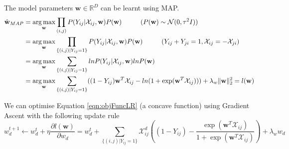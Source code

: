 	The model parameters $\textbf{w} \in \mathbb{R}^D$ can be learnt using MAP.
	\begin{align}
		\label{eqn:objFuncLR}
		\hat{\textbf{w}}_{MAP} &= \operatorname*{arg\,max}_{\textbf{w}} \prod_{(i,j)} P(Y_{ij}| \mathcal{X}_{ij}, \textbf{w}) P(\textbf{w}) \hspace{1 cm} \text{($P(\textbf{w}) \sim \mathcal{N} (0, \tau^2 I) $)}\\ \notag
		&= \operatorname*{arg\,max}_{\textbf{w}} \prod_{\{(i,j)|Y_{ij}=1\}} P(Y_{ij}| \mathcal{X}_{ij}, \textbf{w}) P(\textbf{w}) \hspace{1 cm} \text{($Y_{ij} + Y_{ji} = 1, \mathcal{X}_{ij} = - \mathcal{X}_{ji}$)}\\ \notag
		&= \operatorname*{arg\,max}_{\textbf{w}} \sum_{\{(i,j)|Y_{ij}=1\}} ln P(Y_{ij}| \mathcal{X}_{ij}, \textbf{w}) ln P(\textbf{w}) \\ \notag
		&= \operatorname*{arg\,max}_{\textbf{w}} \sum_{\{(i,j)|Y_{ij}=1\}} ( (1 - Y_{ij})\textbf{w}^T\mathcal{X}_{ij} - ln(1 + \exp(\textbf{w}^T\mathcal{X}_{ij}))) + \lambda_w \|\textbf{w} \|^2_2 = l(\textbf{w})
	\end{align}
	
	We can optimise Equation \ref{eqn:objFuncLR} (a concave function) using Gradient Ascent with the following update rule
	\begin{equation}
	w^{t+1}_d \leftarrow w^t_d + \eta \frac{\partial l(\textbf{w})}{\partial w_d} = w^t_d + \sum_{\{(i,j)|Y_{ij}=1\}} \mathcal{X}_{ij}^d ( (1 - Y_{ij}) - \frac{\exp(\textbf{w}^T\mathcal{X}_{ij})}{1 + \exp(\textbf{w}^T\mathcal{X}_{ij})})  + \lambda_w w_d
	\end{equation}
